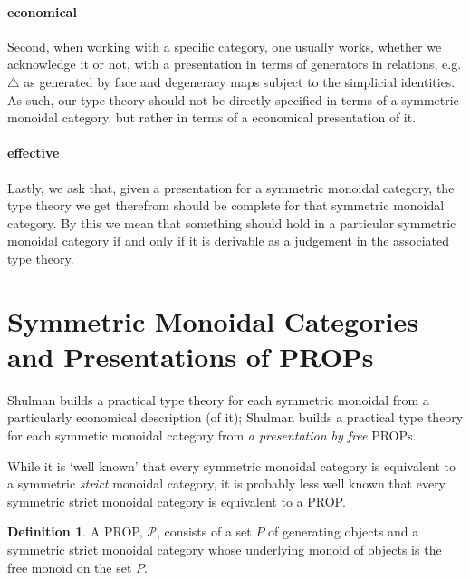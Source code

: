 \documentclass[pra,floatfix,
amsmath,superscriptaddress, 12pt]{article}
\theoremstyle{definition}
\newtheorem{definition}{Definition}
\newcommand{\mc}[1]{\mathcal{#1}}
\begin{document}
\paragraph{economical} Second, when working with a specific category, one usually works, whether we acknowledge it or not, with a presentation in terms of generators in relations, e.g. $\bigtriangleup$ as generated by face and degeneracy maps subject to the simplicial identities. As such, our type theory should not be directly specified in terms of a symmetric monoidal category, but rather in terms of a economical presentation of it. 

\paragraph{effective} Lastly, we ask that, given a presentation for a symmetric monoidal category, the type theory we get therefrom should be complete for that symmetric monoidal category. By this we mean that something should hold in a particular symmetric monoidal category if and only if it is derivable as a judgement in the associated type theory.

\section{Symmetric Monoidal Categories and Presentations of \textsf{PROP}s}

Shulman builds a practical type theory for each symmetric monoidal from a particularly economical description (of it); Shulman builds a practical type theory for each symmetic monoidal category from \emph{a presentation by free} \textsf{PROP}s.

While it is `well known' that every symmetric monoidal category is equivalent
to a symmetric \emph{strict} monoidal category, it is probably less well known
that every symmetric strict monoidal category is equivalent to
a PROP.

\begin{definition} A PROP, $\mc{P}$, consists of a set $P$ of generating objects and a symmetric strict monoidal category whose underlying monoid of objects is the free monoid on the set $P$.
\end{definition}
\end{document}
